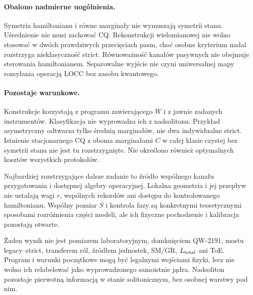 \documentclass[11pt,a4paper]{article}
\begin{document}
\paragraph{Obalono nadmierne uogólnienia.}
Symetria hamiltonianu i równe marginały nie wymuszają symetrii stanu.
Uśrednienie nie musi zachować CQ. Rekonstrukcji wielomianowej nie
wolno stosować w dwóch prawdziwych przecięciach pasm, choć osobne
kryterium nadal rozstrzyga nieklasyczność strict. Równoważność kanałów
pasywnych nie obejmuje sterowania hamiltonianem. Separowalne wyjście
nie czyni uniwersalnej mapy rozsyłania operacją LOCC bez zasobu kwantowego.

\paragraph{Pozostaje warunkowe.}
Konstrukcje korzystają z programu zawierającego $W$ i z jawnie zadanych
instrumentów. Klasyfikacja nie wyprowadza ich z nadsolitonu.
Przykład asymetryczny odtwarza tylko średnią marginałów, nie dwa
indywidualne strict. Istnienie stacjonarnego CQ z oboma marginałami
$C$ w całej klasie czystej bez symetrii stanu nie jest tu rozstrzygnięte.
Nie określono również optymalnych kosztów wszystkich protokołów.

Najbardziej rozstrzygające dalsze zadanie to źródło wspólnego kanału
przygotowania i dostępnej algebry operacyjnej. Lokalna geometria i jej
przepływ nie ustalają wagi $r$, wspólnych rekordów ani dostępu do
kontrolowanego hamiltonianu. Wspólny pomiar $S$ i kontrola fazy są
konkretnymi teoretycznymi sposobami rozróżnienia części modeli,
ale ich fizyczne pochodzenie i kalibracja pozostają otwarte.

Żaden wynik nie jest pomiarem laboratoryjnym, domknięciem QW-2191,
mostu legacy--strict, transferem ról, źródłem jednostek, SM/GR,
$L_{\rm total}$ ani ToE. Program i warunki początkowe mogą być
legalnymi wejściami fizyki, lecz nie wolno ich relabelować jako
wyprowadzonego samoistnie jądra. Nadsoliton pozostaje pierwotną
informacją w stanie solitonicznym, bez osobnej warstwy pod nim.
\end{document}
